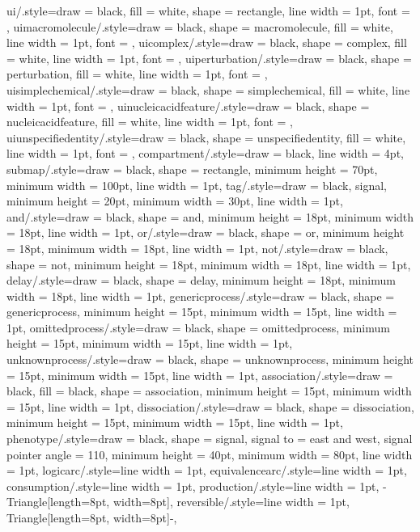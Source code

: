 {    ui/.style={draw = black, fill = white, shape = rectangle, line width = 1pt, font = {\scriptsize\sffamily}},
    uimacromolecule/.style={draw = black, shape = macromolecule, fill = white, line width = 1pt, font = {\tiny\sffamily}},
    uicomplex/.style={draw = black, shape = complex, fill = white, line width = 1pt, font = {\tiny\sffamily}},
    uiperturbation/.style={draw = black, shape = perturbation, fill = white, line width = 1pt, font = {\tiny\sffamily}},
    uisimplechemical/.style={draw = black, shape = simplechemical, fill = white, line width = 1pt, font = {\tiny\sffamily}},
    uinucleicacidfeature/.style={draw = black, shape = nucleicacidfeature, fill = white, line width = 1pt, font = {\tiny\sffamily}},
    uiunspecifiedentity/.style={draw = black, shape = unspecifiedentity, fill = white, line width = 1pt, font = {\tiny\sffamily}},
    compartment/.style={draw = black, line width = 4pt},
    submap/.style={draw = black, shape = rectangle, minimum height = 70pt, minimum width = 100pt, line width = 1pt},
    tag/.style={draw = black, signal, minimum height = 20pt, minimum width = 30pt, line width = 1pt},
    and/.style={draw = black, shape = and, minimum height = 18pt, minimum width = 18pt, line width = 1pt},
    or/.style={draw = black, shape = or, minimum height = 18pt, minimum width = 18pt, line width = 1pt},
    not/.style={draw = black, shape = not, minimum height = 18pt, minimum width = 18pt, line width = 1pt},
    delay/.style={draw = black, shape = delay, minimum height = 18pt, minimum width = 18pt, line width = 1pt},
    genericprocess/.style={draw = black, shape = genericprocess, minimum height = 15pt, minimum width = 15pt, line width = 1pt},
    omittedprocess/.style={draw = black, shape = omittedprocess, minimum height = 15pt, minimum width = 15pt, line width = 1pt},
    unknownprocess/.style={draw = black, shape = unknownprocess, minimum height = 15pt, minimum width = 15pt, line width = 1pt},
    association/.style={draw = black, fill = black, shape = association, minimum height = 15pt, minimum width = 15pt, line width = 1pt},
    dissociation/.style={draw = black, shape = dissociation, minimum height = 15pt, minimum width = 15pt, line width = 1pt},
    phenotype/.style={draw = black, shape = signal, signal to = east and west, signal pointer angle = 110, minimum height = 40pt, minimum width = 80pt, line width = 1pt},
    logicarc/.style={line width = 1pt},
    equivalencearc/.style={line width = 1pt},
    consumption/.style={line width = 1pt},
    production/.style={line width = 1pt, -{Triangle[length=8pt, width=8pt]}},
    reversible/.style={line width = 1pt, {Triangle[length=8pt, width=8pt]}-},
}
